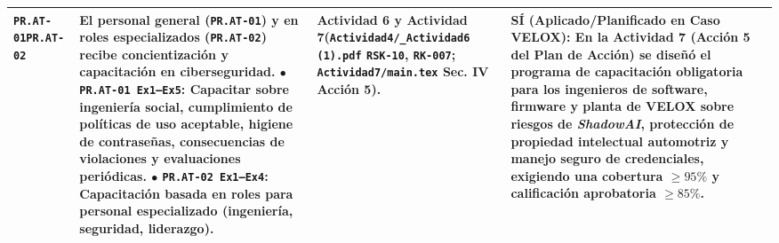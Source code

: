 \documentclass[letterpaper,11pt]{article}
\begin{document}
\begin{longtable}{|C{1.5cm}|L{5.3cm}|L{4.3cm}|L{5.8cm}|}
\texttt{PR.AT-01}\newline \texttt{PR.AT-02} &
\textbf{El personal general (\texttt{PR.AT-01}) y en roles especializados (\texttt{PR.AT-02}) recibe concientización y capacitación en ciberseguridad.}\newline
$\bullet$ \texttt{PR.AT-01 Ex1--Ex5}: Capacitar sobre ingeniería social, cumplimiento de políticas de uso aceptable, higiene de contraseñas, consecuencias de violaciones y evaluaciones periódicas.\newline
$\bullet$ \texttt{PR.AT-02 Ex1--Ex4}: Capacitación basada en roles para personal especializado (ingeniería, seguridad, liderazgo). &
\textbf{Actividad 6 y Actividad 7}\newline (\texttt{Actividad4/\_Actividad6 (1).pdf} \texttt{RSK-10}, \texttt{RK-007}; \texttt{Actividad7/main.tex} Sec. IV Acción 5). &
\textbf{SÍ (Aplicado/Planificado en Caso VELOX):}\newline
En la Actividad 7 (Acción 5 del Plan de Acción) se diseñó el programa de capacitación obligatoria para los ingenieros de software, firmware y planta de VELOX sobre riesgos de \textit{ShadowAI}, protección de propiedad intelectual automotriz y manejo seguro de credenciales, exigiendo una cobertura $\ge 95\%$ y calificación aprobatoria $\ge 85\%$. \\
\hline


\end{longtable}
\end{document}
